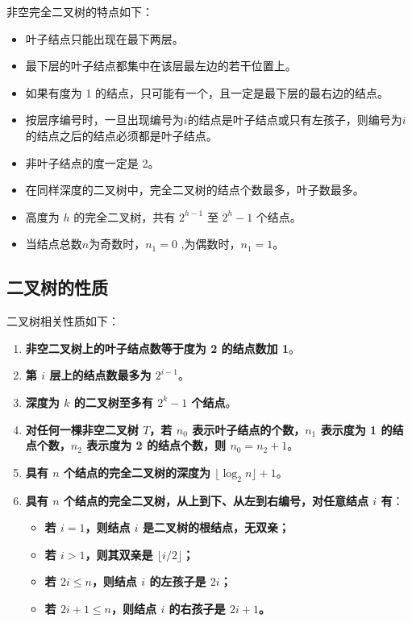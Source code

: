 \documentclass[lang=cn,newtx,10pt,scheme=chinese]{../elegantbook}
\begin{document}
非空完全二叉树的特点如下：

\begin{itemize}
  \item 叶子结点只能出现在最下两层。
  \item 最下层的叶子结点都集中在该层最左边的若干位置上。
  \item 如果有度为 1 的结点，只可能有一个，且一定是最下层的最右边的结点。
  \item 按层序编号时，一旦出现编号为$i$的结点是叶子结点或只有左孩子，则编号为$i$的结点之后的结点必须都是叶子结点。
  \item 非叶子结点的度一定是 2。
  \item 在同样深度的二叉树中，完全二叉树的结点个数最多，叶子数最多。
  \item 高度为 $h$ 的完全二叉树，共有 $2^{h-1}$ 至 $2^h - 1$ 个结点。
  \item 当结点总数$n$为奇数时，$n_1 = 0$ ,为偶数时，$n_1 = 1$。
  \end{itemize}

\subsection{二叉树的性质}

二叉树相关性质如下：

\begin{enumerate}
  \item \textbf{非空二叉树上的叶子结点数等于度为 2 的结点数加 1}。
  \item \textbf{第 $i$ 层上的结点数最多为 $2^{i-1}$}。
  \item \textbf{深度为 $k$ 的二叉树至多有 $2^k - 1$ 个结点}。
  \item \textbf{对任何一棵非空二叉树 $T$，若 $n_0$ 表示叶子结点的个数，$n_1$ 表示度为 1 的结点个数，$n_2$ 表示度为 2 的结点个数，则 $n_0 = n_2 + 1$}。
  \item \textbf{具有 $n$ 个结点的完全二叉树的深度为 $\lfloor \log_2 n \rfloor + 1$}。
  \item \textbf{具有 $n$ 个结点的完全二叉树，从上到下、从左到右编号，对任意结点 $i$ 有}：
  \begin{itemize}
    \item \textbf{若 $i = 1$，则结点 $i$ 是二叉树的根结点，无双亲；}
    \item \textbf{若 $i > 1$，则其双亲是 $\lfloor i/2 \rfloor$；}
    \item \textbf{若 $2i \leq n$，则结点 $i$ 的左孩子是 $2i$；}
    \item \textbf{若 $2i + 1 \leq n$，则结点 $i$ 的右孩子是 $2i + 1$。}
  \end{itemize}
\end{enumerate}
\end{document}
